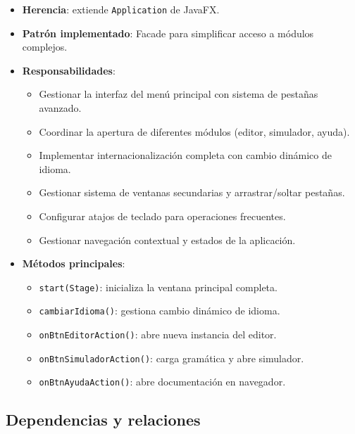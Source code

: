 \begin{itemize}
    \item \textbf{Herencia}: extiende \texttt{Application} de JavaFX.
    \item \textbf{Patrón implementado}: Facade para simplificar acceso a módulos complejos.
    \item \textbf{Responsabilidades}:
    \begin{itemize}
        \item Gestionar la interfaz del menú principal con sistema de pestañas avanzado.
        \item Coordinar la apertura de diferentes módulos (editor, simulador, ayuda).
        \item Implementar internacionalización completa con cambio dinámico de idioma.
        \item Gestionar sistema de ventanas secundarias y arrastrar/soltar pestañas.
        \item Configurar atajos de teclado para operaciones frecuentes.
        \item Gestionar navegación contextual y estados de la aplicación.
    \end{itemize}
    \item \textbf{Métodos principales}:
    \begin{itemize}
        \item \texttt{start(Stage)}: inicializa la ventana principal completa.
        \item \texttt{cambiarIdioma()}: gestiona cambio dinámico de idioma.
        \item \texttt{onBtnEditorAction()}: abre nueva instancia del editor.
        \item \texttt{onBtnSimuladorAction()}: carga gramática y abre simulador.
        \item \texttt{onBtnAyudaAction()}: abre documentación en navegador.
    \end{itemize}
\end{itemize}

\subsection{Dependencias y relaciones}

